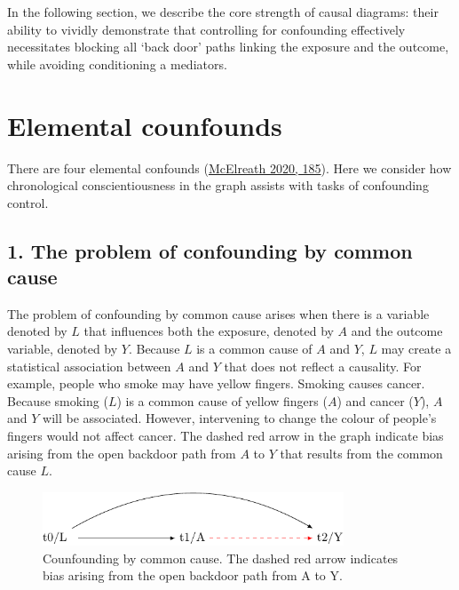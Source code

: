 \documentclass[
  singlecolumn]{report}
\begin{document}
In the following section, we describe the core strength of causal
diagrams: their ability to vividly demonstrate that controlling for
confounding effectively necessitates blocking all `back door' paths
linking the exposure and the outcome, while avoiding conditioning a
mediators.

\hypertarget{elemental-counfounds}{%
\section{Elemental counfounds}\label{elemental-counfounds}}

There are four elemental confounds
(\protect\hyperlink{ref-mcelreath2020}{McElreath 2020, 185}). Here we
consider how chronological conscientiousness in the graph assists with
tasks of confounding control.

\hypertarget{the-problem-of-confounding-by-common-cause}{%
\subsection{1. The problem of confounding by common
cause}\label{the-problem-of-confounding-by-common-cause}}

The problem of confounding by common cause arises when there is a
variable denoted by \(L\) that influences both the exposure, denoted by
\(A\) and the outcome variable, denoted by \(Y.\) Because \(L\) is a
common cause of \(A\) and \(Y\), \(L\) may create a statistical
association between \(A\) and \(Y\) that does not reflect a causality.
For example, people who smoke may have yellow fingers. Smoking causes
cancer. Because smoking (\(L\)) is a common cause of yellow fingers
(\(A\)) and cancer (\(Y\)), \(A\) and \(Y\) will be associated. However,
intervening to change the colour of people's fingers would not affect
cancer. The dashed red arrow in the graph indicate bias arising from the
open backdoor path from \(A\) to \(Y\) that results from the common
cause \(L\).

\begin{figure}

{\centering \includegraphics[width=0.8\textwidth,height=\textheight]{causal-dags_files/figure-pdf/fig-dag-common-cause-1.pdf}

}

\caption{\label{fig-dag-common-cause}Counfounding by common cause. The
dashed red arrow indicates bias arising from the open backdoor path from
A to Y.}

\end{figure}
\end{document}
